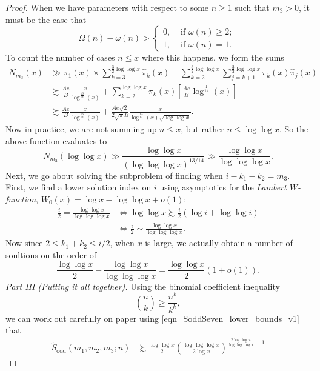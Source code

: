\documentclass[11pt,reqno,a4letter]{article}
\numberwithin{figure}{section}
\numberwithin{table}{section}
\theoremstyle{plain}
\numberwithin{theorem}{section}
\theoremstyle{definition}
\newcommand{\NBRef}[1]{
     \todo[linecolor=green!85!white,backgroundcolor=orange!50!white,bordercolor=blue!30!black,textcolor=cyan!15!black,shadow,size=\small,fancyline]{
     \color{NBRefColor}{\textbf{#1}
     }
     }
}
\begin{document}
\begin{proof}
\NBRef{A09-2020.04-26} 
When we have parameters with respect to some $n \geq 1$ 
such that $m_3 > 0$, it must be the case that 
\[
\Omega(n) - \omega(n) > \begin{cases} 
     0, & \text{ if $\omega(n) \geq 2$; } \\ 
     1, & \text{ if $\omega(n) = 1$. } 
     \end{cases}
\]
To count the number of cases $n \leq x$ where this happens, we form the sums 
\begin{align*} 
N_{m_3}(x) & \gg \pi_1(x) \times \sum_{k=3}^{\frac{3}{2} \log\log x} \widehat{\pi}_k(x) + 
     \sum_{k=2}^{\frac{3}{2} \log\log x} \sum_{j=k+1}^{\frac{3}{2} \log\log x} 
     \pi_k(x) \widehat{\pi}_j(x) \\ 
     & \succsim \frac{Ae}{B} \frac{x}{\log^{\frac{13}{14}}(x)} + 
     \sum_{k=2}^{\log\log x} \pi_k(x) \left[ 
     \frac{Ae}{B} \log^{\frac{1}{14}}(x) 
     \right] \\ 
     & \succsim \frac{Ae}{B} \frac{x}{\log^{\frac{13}{14}}(x)} + 
     \frac{Ae \sqrt{2}}{2 \sqrt{\pi} B} \frac{x}{\log^{\frac{13}{14}}(x) \sqrt{\log\log x}}. 
\end{align*} 
Now in practice, we are not summing up $n \leq x$, but rather $n \leq \log\log x$. So the 
above function evaluates to 
\[
N_{m_3}(\log\log x) \gg \frac{\log\log x}{(\log\log\log x)^{13/14}} \gg 
     \frac{\log\log x}{\log\log\log x}. 
\]
Next, we go about solving the subproblem of finding when $i-k_1-k_2 = m_3$. First, we find a lower 
solution index on $i$ using asymptotics for the \emph{Lambert $W$-function}, 
$W_0(x) = \log x - \log\log x + o(1)$: 
\begin{align*} 
\frac{i}{2} = \frac{\log\log x}{\log\log\log x} & \iff \log\log x \succsim \frac{i}{2}\left( 
     \log i + \log\log i\right) \\ 
     & \iff \frac{i}{2} \sim \frac{\log\log x}{\log\log\log x}. 
\end{align*} 
Now since $2 \leq k_1+k_2 \leq i/2$, when $x$ is large, we actually obtain a number of 
soultions on the order of 
\[
\frac{\log\log x}{2} - \frac{\log\log x}{\log\log\log x} = \frac{\log\log x}{2} (1+o(1)). 
\]
\textit{Part III (Putting it all together). } 
Using the binomial coefficient inequality 
\[
\binom{n}{k} \geq \frac{n^k}{k^k}, 
\]
we can work out carefully on paper using \eqref{eqn_SoddSeven_lower_bounds_v1} that 
\begin{align*} 
\widetilde{S}_{\operatorname{odd}}(m_1, m_2, m_3; n) & \succsim 
     \frac{\log\log x}{2} \left(\frac{\log\log\log x}{2 \log x}\right)^{\frac{2\log\log x}{\log\log\log x}+1} 

\end{align*}
\end{proof}
\end{document}
